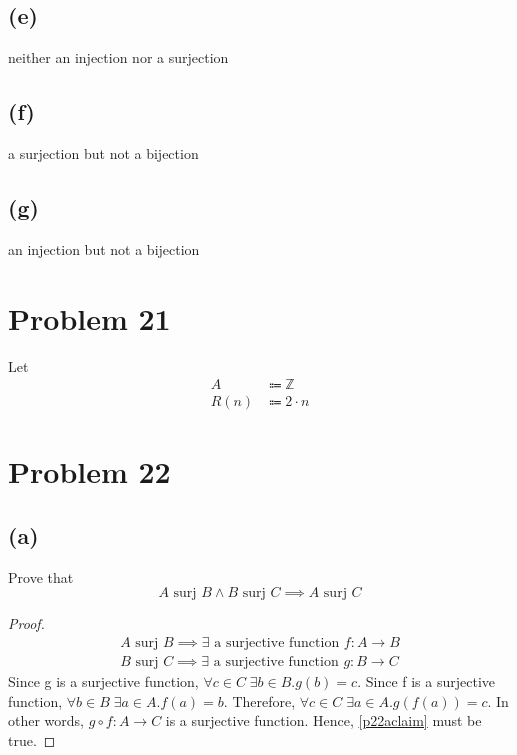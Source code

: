 \documentclass{article}
\newcommand{\surj}{\text{ surj }}
\begin{document}
\subsection{(e)}
neither an injection nor a surjection
\subsection{(f)}
a surjection but not a bijection
\subsection{(g)}
an injection but not a bijection

\pagebreak

\section{Problem 21}
Let
\begin{align*}
	A    & \Coloneqq \mathbb{Z} \\
	R(n) & \Coloneqq 2 \cdot n
\end{align*}

\pagebreak

\section{Problem 22}
\subsection{(a)}
Prove that
\begin{equation}\label{p22aclaim}
	A \surj B \land B \surj C \implies A \surj C
\end{equation}
\begin{proof}
	\begin{align*}
		A \surj B \implies \exists \text{ a surjective function } f : A \rightarrow B \\
		B \surj C \implies \exists \text{ a surjective function } g : B \rightarrow C
	\end{align*}
	Since g is a surjective function, $\forall c \in C \; \exists b \in B.g(b) = c$. Since f is a surjective function, $\forall b \in B \; \exists a \in A.f(a) = b$. Therefore, $\forall c \in C \; \exists a \in A.g(f(a)) = c$. In other words, $g \circ f : A \rightarrow C$ is a surjective function. Hence, \eqref{p22aclaim} must be true.
\end{proof}
\end{document}
